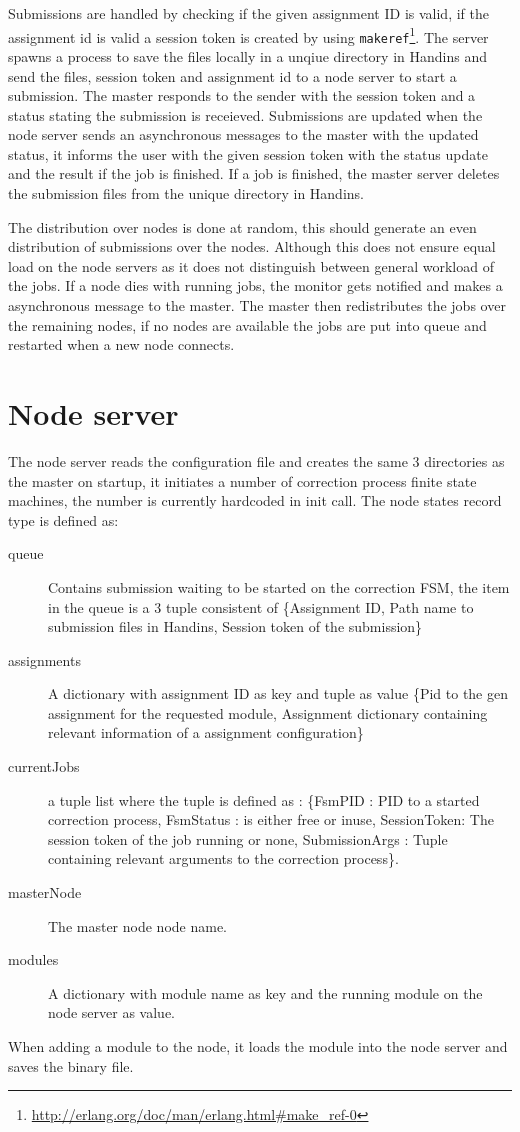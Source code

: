 Submissions are handled by checking if the given assignment ID is valid, if the assignment id is valid a session token is created by using \texttt{makeref}\footnote{\url{http://erlang.org/doc/man/erlang.html\#make_ref-0}}. The server spawns a process to save the files locally in a unqiue directory in Handins and send the files, session token and assignment id to a node server to start a submission. The master responds to the sender with the session token and a status stating the submission is receieved. Submissions are updated when the node server sends an asynchronous messages to the master with the updated status, it informs the user with the given session token with the status update and the result if the job is finished. If a job is finished, the master server deletes the submission files from the unique directory in Handins.

The distribution over nodes is done at random, this should generate an even distribution of submissions over the nodes. Although this does not ensure equal load on the node servers as it does not distinguish between general workload of the jobs. If a node dies with running jobs, the monitor gets notified and makes a asynchronous message to the master. The master then redistributes the jobs over the remaining nodes, if no nodes are available the jobs are put into queue and restarted when a new node connects.
\section{Node server}
The node server reads the configuration file and creates the same 3 directories as the master on startup, it initiates a number of correction process finite state machines, the number is currently hardcoded in init call. The node states record type is defined as:
\begin{description}
     \item [queue] Contains submission waiting to be started on the correction FSM, the item in the queue is a 3 tuple consistent of \{Assignment ID, Path name to submission files in Handins, Session token of the submission\}
     \item [assignments] A dictionary with assignment ID as key and tuple as value \{Pid to the gen assignment for the requested module, Assignment dictionary containing relevant information of a assignment configuration\}
     \item [currentJobs] a tuple list where the tuple is defined as : \{FsmPID : PID to a started correction process, FsmStatus : is either free or inuse, SessionToken: The session token of the job running or none, SubmissionArgs : Tuple containing relevant arguments to the correction process\}.
     \item [masterNode] The master node node name.
     \item [modules]  A dictionary with module name as key and the running module on the node server as value.
 \end{description}
When adding a module to the node, it loads the module into the node server and saves the binary file.

